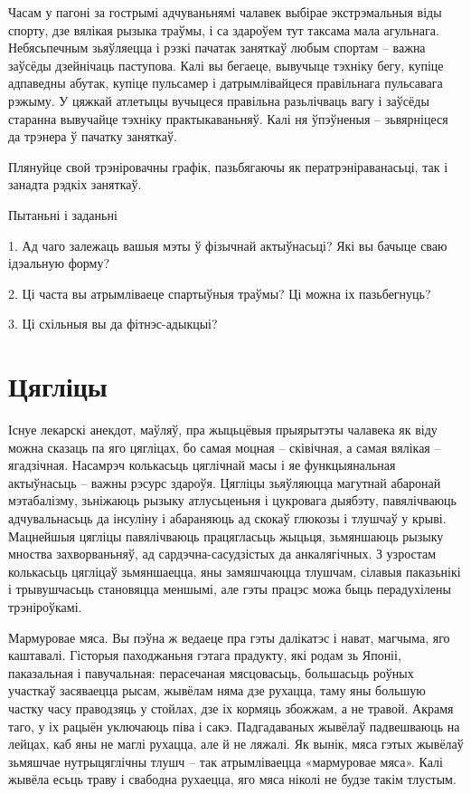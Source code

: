 Часам у пагоні за гострымі адчуваньнямі чалавек выбірае экстрэмальныя віды спорту, дзе вялікая рызыка траўмы, і са здароўем тут таксама мала агульнага. Небясьпечным зьяўляецца і рэзкі пачатак заняткаў любым спортам – важна заўсёды дзейнічаць паступова. Калі вы бегаеце, вывучыце тэхніку бегу, купіце адпаведны абутак, купіце пульсамер і датрымлівайцеся правільнага пульсавага рэжыму. У цяжкай атлетыцы вучыцеся правільна разьлічваць вагу і заўсёды старанна вывучайце тэхніку практыкаваньняў. Калі ня ўпэўненыя – зьвярніцеся да трэнера ў пачатку заняткаў.

Плянуйце свой трэніровачны графік, пазьбягаючы як ператрэніраванасьці, так і занадта рэдкіх заняткаў.

Пытаньні і заданьні

1. Ад чаго залежаць вашыя мэты ў фізычнай актыўнасьці? Які вы бачыце сваю ідэальную форму?

2. Ці часта вы атрымліваеце спартыўныя траўмы? Ці можна іх пазьбегнуць?

3. Ці схільныя вы да фітнэс-адыкцыі?


\section{Цягліцы}

Існуе лекарскі анекдот, маўляў, пра жыцьцёвыя прыярытэты чалавека як віду можна сказаць па яго цягліцах, бо самая моцная – сківічная, а самая вялікая – ягадзічная. Насамрэч колькасьць цяглічнай масы і яе функцыянальная актыўнасьць – важны рэсурс здароўя. Цягліцы зьяўляюцца магутнай абаронай мэтабалізму, зьніжаюць рызыку атлусьценьня і цукровага дыябэту, павялічваюць адчувальнасьць да інсуліну і абараняюць ад скокаў глюкозы і тлушчаў у крыві. Мацнейшыя цягліцы павялічваюць працягласьць жыцьця, зьмяншаюць рызыку мноства захворваньняў, ад сардэчна-сасудзістых да анкалягічных. З узростам колькасьць цягліцаў зьмяншаецца, яны замяшчаюцца тлушчам, сілавыя паказьнікі і трывушчасьць становяцца меншымі, але гэты працэс можа быць перадухілены трэніроўкамі.

Мармуровае мяса. Вы пэўна ж ведаеце пра гэты далікатэс і нават, магчыма, яго каштавалі. Гісторыя паходжаньня гэтага прадукту, які родам зь Японіі, паказальная і павучальная: перасечаная мясцовасьць, большасьць роўных участкаў засяваецца рысам, жывёлам няма дзе рухацца, таму яны большую частку часу праводзяць у стойлах, дзе іх кормяць збожжам, а не травой. Акрамя таго, у іх рацыён уключаюць піва і сакэ. Падгадаваных жывёлаў падвешваюць на лейцах, каб яны не маглі рухацца, але й не ляжалі. Як вынік, мяса гэтых жывёлаў зьмяшчае нутрыцяглічны тлушч – так атрымліваецца «мармуровае мяса». Калі жывёла есьць траву і свабодна рухаецца, яго мяса ніколі не будзе такім тлустым.

